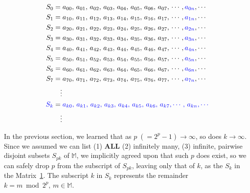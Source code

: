\documentclass[12pt]{article}
\theoremstyle{definition} %
\numberwithin{equation}{section}
\begin{document}
\begin{figure}[H]
\centering
\captionsetup[figure]{name=Matrix}
\vspace{-0.8em}  %
\begin{minipage}{0.95\linewidth}
\begin{align*}
S_0 &= a_{00},\, a_{01},\, a_{02},\, a_{03},\, 
 a_{04},\, a_{05},\, a_{06},\, a_{07},\,\cdots,\textcolor{blue}{a_{0n}}, \cdots\\
S_1 &= a_{10},\, a_{11},\, a_{12},\, a_{13},\, 
 a_{14},\, a_{15},\, a_{16},\, a_{17},\,\cdots,\textcolor{blue}{a_{1n}}, \cdots\\
S_2 &= a_{20},\, a_{21},\, a_{22},\, a_{23},\, 
 a_{24},\, a_{25},\, a_{26},\, a_{27},\,\cdots,\textcolor{blue}{a_{2n}}, \cdots\\
S_3 &= a_{30},\, a_{31},\, a_{32},\, a_{33},\, 
 a_{34},\, a_{35},\, a_{36},\, a_{37},\,\cdots,\textcolor{blue}{a_{3n}}, \cdots\\
S_4 &= a_{40},\, a_{41},\, a_{42},\, a_{43},\, 
 a_{44},\, a_{45},\, a_{46},\, a_{47},\,\cdots,\textcolor{blue}{a_{4n}}, \cdots\\
S_5 &= a_{50},\, a_{51},\, a_{52},\, a_{53},\, 
 a_{54},\, a_{55},\, a_{56},\, a_{57},\,\cdots,\textcolor{blue}{a_{5n}}, \cdots\\
S_6 &= a_{60},\, a_{61},\, a_{62},\, a_{63},\, 
 a_{64},\, a_{65},\, a_{66},\, a_{67},\,\cdots,\textcolor{blue}{a_{6n}}, \cdots\\
S_7 &= a_{70},\, a_{71},\, a_{72},\, a_{73},\, 
 a_{74},\, a_{75},\, a_{76},\, a_{77},\,\cdots,\textcolor{blue}{a_{7n}}, \cdots\\
    & \quad \vdots \\
\textcolor{blue}{S_k} &=\textcolor{blue}{a_{k0},\, a_{k1},\, a_{k2},\, a_{k3},\, 
 a_{k4},\, a_{k5},\, a_{k6},\, a_{k7},
 \cdots,\,a_{kn}, \cdots}\\
     & \quad \vdots
\end{align*}
\end{minipage}
\label{fig:decompo-2-s-pk}
\end{figure}
In the previous section, we learned that as
\( p \; (= 2^p - 1) \to \infty \), so does \(k \to \infty \). Since we assumed we can list (1) \textbf{ALL} (2) infinitely many, (3) infinite, pairwise disjoint subsets \(S_{pk}\) of \(\mathbb{M}\), we implicitly agreed upon that such \(p\) does exist, so we can safely drop \(p\) from the subscript of \(S_{pk}\), leaving only that of \(k\), as the \(S_{k}\) in the Matrix~\ref{fig:decompo-2-s-pk}. The subscript \(k\) in \(S_k\) represents the remainder \(k= m\bmod 2^p,\, m \in \mathbb{M}\).
\end{document}
